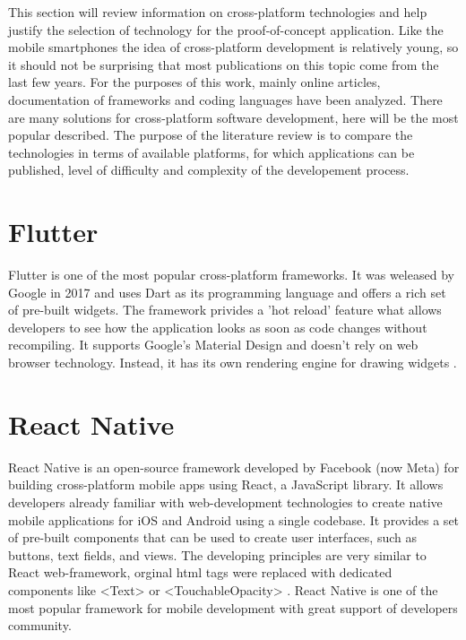 This section will review information on cross-platform technologies and help justify the selection of technology for the proof-of-concept application. Like the mobile smartphones the idea of cross-platform development is relatively young, so it should not be surprising that most publications on this topic come from the last few years. For the purposes of this work, mainly online articles, documentation of frameworks and coding languages have been analyzed. There are many solutions for cross-platform software development, here will be the most popular described. The purpose of the literature review is to compare the technologies in terms of available platforms, for which applications can be published, level of difficulty and complexity of the developement process.


\section{{Flutter}}%
\label{sec:flutter}

Flutter is one of the most popular cross-platform frameworks. It was weleased by Google in 2017 and uses Dart as its programming language and offers a rich set of pre-built widgets.
The framework privides a 'hot reload' feature what allows developers to see how the application looks as soon as code changes without recompiling. It supports Google's Material Design and doesn't rely on web browser technology. Instead, it has its own rendering engine for drawing widgets \autocite{FlutterDoc}.

\section{{React Native}}%
\label{sec:reactnative}

React Native is an open-source framework developed by Facebook (now Meta) for building cross-platform mobile apps using React, a JavaScript library. It allows developers already familiar with  web-development technologies to create native mobile applications for iOS and Android using a single codebase. It provides a set of pre-built components that can be used to create user interfaces, such as buttons, text fields, and views. The developing principles are very similar to React web-framework, orginal html tags were replaced with dedicated components like <Text> or <TouchableOpacity> \autocite{ReactNative}. React Native is one of the most popular framework for mobile development with great support of developers community.

